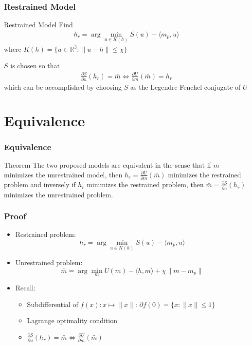 \documentclass[utf8,aspectratio=169,ngerman,english]{beamer}
\begin{document}
\begin{frame}
\frametitle{Restrained Model \cite{inproceedings}}
\begin{block}{Restrained Model}
Find
 \begin{align}
  h_r = \arg \min_{u \in K(h)} S(u) - \langle m_p , u \rangle
 \end{align}
where $K(h) = \{u \in \mathbb R^3: \|u - h\| \leq \chi \}$
\end{block}
$S$ is chosen so that
\begin{align}
 \frac{\partial S}{\partial u}(h_r) = \bar m \Leftrightarrow \frac{\partial U}{\partial m}(\bar m) = h_r
\end{align} which can be accomplished by choosing $S$ as the Legendre-Fenchel conjugate of $U$
\cite{inproceedings}


\end{frame}

\section{Equivalence}
\begin{frame}
\frametitle{Equivalence}
\begin{block}{Theorem}
 The two proposed models are equivalent in the sense that if $\bar m$ minimizes the unrestrained model, then $h_r = \frac{\partial U}{\partial m}(\bar m)$ minimizes the restrained problem and inversely if $h_r$ minimizes the restrained problem, then $\bar m = \frac{\partial S}{\partial u}(h_r)$ minimizes the unrestrained problem.
\end{block}

\end{frame}

\begin{frame}
\frametitle{Proof}

\begin{itemize}
    \item Restrained problem: $$h_r = \arg \min_{u \in K(h)} S(u) - \langle m_p , u \rangle$$
    \item Unrestrained problem: $$\bar m = \arg \min_m U(m) - \langle h , m \rangle + \chi \|m - m_p\|$$
    \item Recall: 
    \begin{itemize}
        \item Subdifferential of $f(x): x \mapsto \|x\|$: $\partial f(0) = \{x : \|x\| \leq 1 \}$
        \item Lagrange optimality condition
        \item $\frac{\partial S}{\partial u}(h_r) = \bar m \Leftrightarrow \frac{\partial U}{\partial m}(\bar m)$
    \end{itemize}
    
\end{itemize}
\end{frame}
\end{document}
